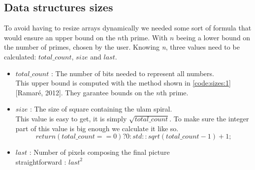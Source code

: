\subsection{Data structures sizes}
To avoid having to resize arrays dynamically we needed some sort of formula that would ensure an upper bound on the $n$th prime. With $n$ beeing a lower bound on the number of primes, chosen by the user. Knowing \textit{n}, three values need to be calculated: $total\_count$, $size$ and $last$.
\begin{itemize}
	\item{$total\_count$} 
	: The number of bits needed to represent all numbers.\\ This upper bound is computed with the method shown in \ref{code:sizes:1} [Ramaré, 2012]. They garantee bounds on the $n$th prime.
	\item{$size$} 
	: The size of square containing the ulam spiral.\\
	This value is easy to get, it is simply $\sqrt{total\_count}$. To make sure the integer part of this value is big enough we calculate it like so.
	$$return (total\_count == 0) ? 0 : std::sqrt(total\_count - 1) + 1;$$

	\item{$last$}
	: Number of pixels composing the final picture\\
	straightforward : ${last}^{2}$
	
	
\end{itemize}


